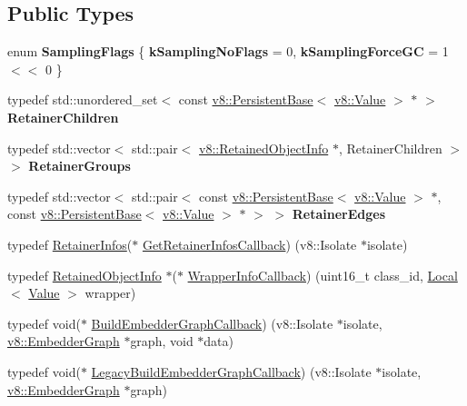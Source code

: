 \subsection*{Public Types}
\begin{DoxyCompactItemize}
\item 
\mbox{\label{classv8_1_1HeapProfiler_aa7826fbe67065080b08309e8f649e049}} 
enum {\bfseries Sampling\+Flags} \{ {\bfseries k\+Sampling\+No\+Flags} = 0, 
{\bfseries k\+Sampling\+Force\+GC} = 1 $<$$<$ 0
 \}
\item 
\mbox{\label{classv8_1_1HeapProfiler_a459770a1e023a4a98a817ec2f0d0195c}} 
typedef std\+::unordered\+\_\+set$<$ const \mbox{\hyperlink{classv8_1_1PersistentBase}{v8\+::\+Persistent\+Base}}$<$ \mbox{\hyperlink{classv8_1_1Value}{v8\+::\+Value}} $>$ $\ast$ $>$ {\bfseries Retainer\+Children}
\item 
\mbox{\label{classv8_1_1HeapProfiler_ab61d84f0fbd7ec48a7a4d29928621c62}} 
typedef std\+::vector$<$ std\+::pair$<$ \mbox{\hyperlink{classv8_1_1RetainedObjectInfo}{v8\+::\+Retained\+Object\+Info}} $\ast$, Retainer\+Children $>$ $>$ {\bfseries Retainer\+Groups}
\item 
\mbox{\label{classv8_1_1HeapProfiler_ab3b813a74e2b76b4d617c7eea269fa0f}} 
typedef std\+::vector$<$ std\+::pair$<$ const \mbox{\hyperlink{classv8_1_1PersistentBase}{v8\+::\+Persistent\+Base}}$<$ \mbox{\hyperlink{classv8_1_1Value}{v8\+::\+Value}} $>$ $\ast$, const \mbox{\hyperlink{classv8_1_1PersistentBase}{v8\+::\+Persistent\+Base}}$<$ \mbox{\hyperlink{classv8_1_1Value}{v8\+::\+Value}} $>$ $\ast$ $>$ $>$ {\bfseries Retainer\+Edges}
\item 
typedef \mbox{\hyperlink{structv8_1_1HeapProfiler_1_1RetainerInfos}{Retainer\+Infos}}($\ast$ \mbox{\hyperlink{classv8_1_1HeapProfiler_a7f34c8eb67f9502e5778695187ea0e96}{Get\+Retainer\+Infos\+Callback}}) (v8\+::\+Isolate $\ast$isolate)
\item 
typedef \mbox{\hyperlink{classv8_1_1RetainedObjectInfo}{Retained\+Object\+Info}} $\ast$($\ast$ \mbox{\hyperlink{classv8_1_1HeapProfiler_a677025dd201fd832e0464e5ab0b0d0d4}{Wrapper\+Info\+Callback}}) (uint16\+\_\+t class\+\_\+id, \mbox{\hyperlink{classv8_1_1Local}{Local}}$<$ \mbox{\hyperlink{classv8_1_1Value}{Value}} $>$ wrapper)
\item 
typedef void($\ast$ \mbox{\hyperlink{classv8_1_1HeapProfiler_a29c98afa5ce0ea543eef904201bc3e40}{Build\+Embedder\+Graph\+Callback}}) (v8\+::\+Isolate $\ast$isolate, \mbox{\hyperlink{classv8_1_1EmbedderGraph}{v8\+::\+Embedder\+Graph}} $\ast$graph, void $\ast$data)
\item 
typedef void($\ast$ \mbox{\hyperlink{classv8_1_1HeapProfiler_aafaa85413706329f7767f559b701eb1a}{Legacy\+Build\+Embedder\+Graph\+Callback}}) (v8\+::\+Isolate $\ast$isolate, \mbox{\hyperlink{classv8_1_1EmbedderGraph}{v8\+::\+Embedder\+Graph}} $\ast$graph)
\end{DoxyCompactItemize}
